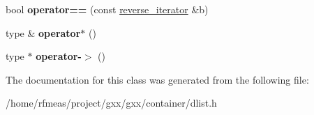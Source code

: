 \begin{DoxyCompactItemize}
\item 
bool {\bfseries operator==} (const \hyperlink{classgxx_1_1dlist_1_1reverse__iterator}{reverse\+\_\+iterator} \&b)\hypertarget{classgxx_1_1dlist_1_1reverse__iterator_a003d0a383e2cfc1ffb862c5b027c6e4c}{}\label{classgxx_1_1dlist_1_1reverse__iterator_a003d0a383e2cfc1ffb862c5b027c6e4c}

\item 
type \& {\bfseries operator$\ast$} ()\hypertarget{classgxx_1_1dlist_1_1reverse__iterator_a37bdf61c1e5af5352e6bb2b90aafecc4}{}\label{classgxx_1_1dlist_1_1reverse__iterator_a37bdf61c1e5af5352e6bb2b90aafecc4}

\item 
type $\ast$ {\bfseries operator-\/$>$} ()\hypertarget{classgxx_1_1dlist_1_1reverse__iterator_a39027e061b1d4a894e2bf23df5f44da4}{}\label{classgxx_1_1dlist_1_1reverse__iterator_a39027e061b1d4a894e2bf23df5f44da4}

\end{DoxyCompactItemize}


The documentation for this class was generated from the following file\+:\begin{DoxyCompactItemize}
\item 
/home/rfmeas/project/gxx/gxx/container/dlist.\+h\end{DoxyCompactItemize}
